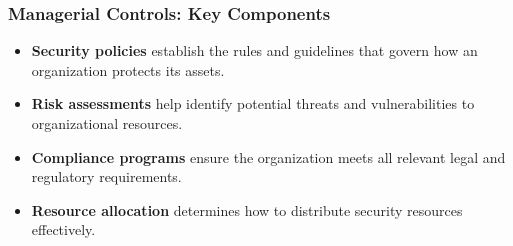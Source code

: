 \documentclass{beamer}
\begin{document}
\begin{frame}
    \frametitle{Managerial Controls: Key Components}
    
    \begin{itemize}
        \item \textbf{Security policies} establish the rules and guidelines that govern how an organization protects its assets.
        
        \item \textbf{Risk assessments} help identify potential threats and vulnerabilities to organizational resources.
        
        \item \textbf{Compliance programs} ensure the organization meets all relevant legal and regulatory requirements.
        
        \item \textbf{Resource allocation} determines how to distribute security resources effectively.
    \end{itemize}
    
\end{frame}
\end{document}
